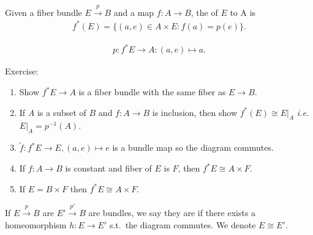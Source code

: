 \documentclass[12pt,class=article,crop=false]{standalone}
\begin{document}
\begin{defn}
Given a fiber bundle $ E \xrightarrow{ p} B$ and a map $ f: A \to B$, the  of $ E$ to A is
 \begin{align*}
	f^* (E) = \{(a,e) \in A \times E: f(a) = p(e)\} . 
\end{align*}
\end{defn}
\begin{align*}
		p: f^* E \to A: (a,e) \mapsto a.
\end{align*}

Exercise:
\begin{enumerate}[label=(\arabic*)]
	\item Show $ f^* E \to A$ is a fiber bundle with the same fiber as $ E \to B$.
	\item If $ A$ is a subset of  $ B$ and  $ f: A \to B$ is inclusion, then show $ f^* (E) \cong E|_A$ \emph{i.e.} $ E|_A = p^{-1}(A)$.
	\item $ \widetilde{ f} : f^* E \to E, (a,e)\mapsto e$ is a bundle map so the diagram commutes.
	\item If $ f: A \to B$ is constant and fiber of $ E$ is  $ F$, then  $ f^* E \cong A \times F$.
	\item If $ E = B \times F$ then $ f^* E \cong A \times F$. 
\end{enumerate}
\begin{defn}
If $ E \xrightarrow{ p} B $ are $ E' \xrightarrow{ p'} B $ are bundles, we say they are  if there exists a homeomorphism $ h: E \to E'$ s.t.\  the diagram commutes. We denote $ E \cong E'$.
\end{defn}
\end{document}
